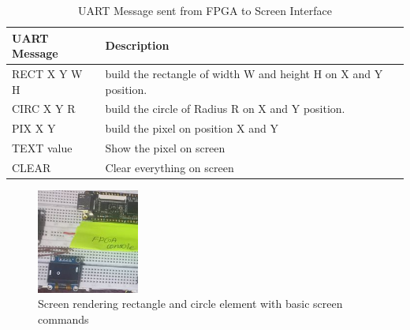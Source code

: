 \documentclass[a4paper,12pt]{article}
\begin{document}
    \begin{table}[H]
        \footnotesize
        \setlength{\tabcolsep}{0.3em} %
        \begin{tabular}{|l|l|}
            \hline
            \textbf{UART Message}  & \textbf{Description} \\ \hline
            RECT X Y W H & build the rectangle of width W and height H on X and Y position. \\ \hline
            CIRC X Y R& build the circle of Radius R on X and Y position. \\ \hline
            PIX X Y & build the pixel on position X and Y\\ \hline
            TEXT value & Show the pixel on screen \\ \hline
            CLEAR & Clear everything on screen \\ \hline
        \end{tabular}
        \caption{UART Message sent from FPGA to Screen Interface}
    \end{table}

    \newpage

    \begin{figure}
        \centering
        \includegraphics[width=0.3\textwidth ]{./images/uart_image.jpg}
        \caption{Screen rendering rectangle and circle element with basic screen commands }
    \end{figure}
\end{document}
